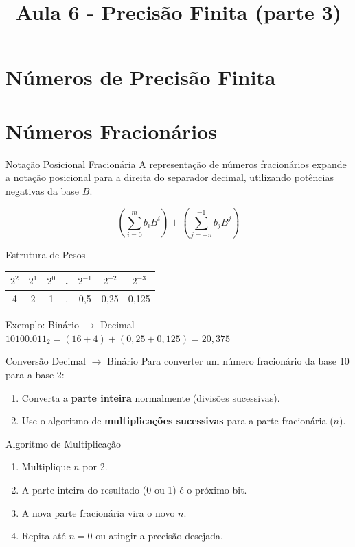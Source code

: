 \section{Números de Precisão Finita}
\title{Aula 6 - Precisão Finita (parte 3)}
\begin{frame}
    \titlepage
\end{frame}

\section{Números Fracionários}

\begin{frame}{Notação Posicional Fracionária}
    A representação de números fracionários expande a notação posicional para a direita do separador decimal, utilizando potências negativas da base $B$.

    $$(\sum_{i=0}^{m} b_i B^i) + (\sum_{j=-n}^{-1} b_j B^j)$$

    \begin{block}{Estrutura de Pesos}
        \centering
        \small
        \begin{tabular}{|c|c|c|c|c|c|c|}
            \hline
            $2^2$ & $2^1$ & $2^0$ & . & $2^{-1}$ & $2^{-2}$ & $2^{-3}$ \\ \hline
            4     & 2     & 1     & . & 0,5      & 0,25     & 0,125    \\ \hline
        \end{tabular}
    \end{block}

    \begin{exampleblock}{Exemplo: Binário $\rightarrow$ Decimal}
        $10100.011_2 = (16+4) + (0,25 + 0,125) = 20,375$
    \end{exampleblock}
\end{frame}

\begin{frame}{Conversão Decimal $\rightarrow$ Binário}
    Para converter um número fracionário da base 10 para a base 2:
    \begin{enumerate}
        \item Converta a \textbf{parte inteira} normalmente (divisões sucessivas).
        \item Use o algoritmo de \textbf{multiplicações sucessivas} para a parte fracionária ($n$).
    \end{enumerate}

    \begin{alertblock}{Algoritmo de Multiplicação}
        \begin{enumerate}
            \item Multiplique $n$ por 2.
            \item A parte inteira do resultado (0 ou 1) é o próximo bit.
            \item A nova parte fracionária vira o novo $n$.
            \item Repita até $n=0$ ou atingir a precisão desejada.
        \end{enumerate}
    \end{alertblock}
\end{frame}

